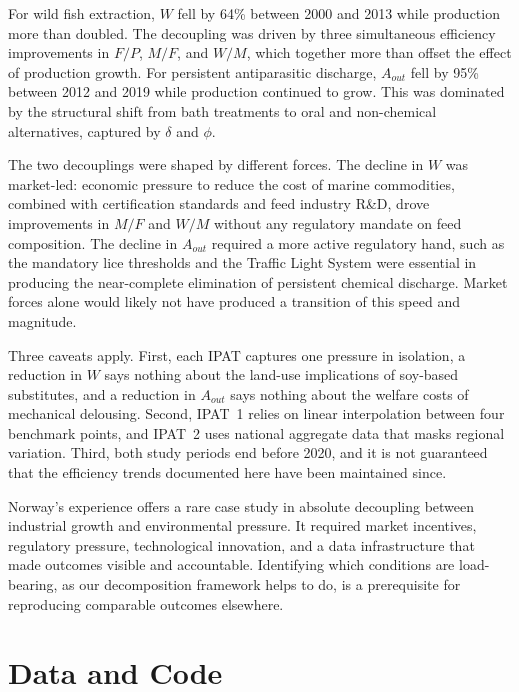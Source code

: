 \documentclass[12pt, a4paper]{report}
\begin{document}
For wild fish extraction, $W$ fell by 64\% between 2000 and 2013 while production more than doubled. The decoupling was driven by three simultaneous efficiency improvements in $F/P$, $M/F$, and $W/M$, which together more than offset the effect of production growth. For persistent antiparasitic discharge, $A_{out}$ fell by 95\% between 2012 and 2019 while production continued to grow. This was dominated by the structural shift from bath treatments to oral and non-chemical alternatives, captured by $\delta$ and $\phi$.

The two decouplings were shaped by different forces. The decline in $W$ was market-led: economic pressure to reduce the cost of marine commodities, combined with certification standards and feed industry R\&D, drove improvements in $M/F$ and $W/M$ without any regulatory mandate on feed composition. The decline in $A_{out}$ required a more active regulatory hand, such as the mandatory lice thresholds and the Traffic Light System were essential in producing the near-complete elimination of persistent chemical discharge. Market forces alone would likely not have produced a transition of this speed and magnitude.

Three caveats apply. First, each IPAT captures one pressure in isolation, a reduction in $W$ says nothing about the land-use implications of soy-based substitutes, and a reduction in $A_{out}$ says nothing about the welfare costs of mechanical delousing. Second, IPAT~1 relies on linear interpolation between four benchmark points, and IPAT~2 uses national aggregate data that masks regional variation. Third, both study periods end before 2020, and it is not guaranteed that the efficiency trends documented here have been maintained since.

Norway's experience offers a rare case study in absolute decoupling between 
industrial growth and environmental pressure. It required market incentives, regulatory pressure, technological innovation, and a data infrastructure that made outcomes visible and accountable. Identifying which conditions are load-bearing, as our decomposition framework helps to do, is a prerequisite for reproducing comparable outcomes elsewhere.

\newpage
\appendix

\chapter{Data and Code}
\end{document}
